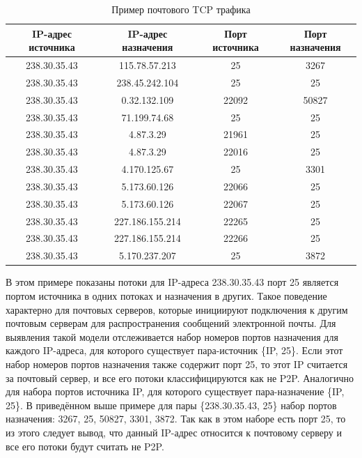 \documentclass[bachelor, och, coursework]{SCWorks}
\begin{document}
\begin{table}[H]
    \caption{Пример почтового TCP трафика}
    \label{table:mail}
    \begin{center}
    {\small
    \begin{tabular}{|c|c|c|c|}
        \hline
    IP-адрес источника & IP-адрес назначения & Порт источника & Порт назначения \\ \hline
    238.30.35.43       &   115.78.57.213     & 25             & 3267 \\ \hline
    238.30.35.43       &    238.45.242.104   & 25             & 25 \\ \hline
    238.30.35.43       &    0.32.132.109     & 22092          & 50827 \\ \hline
    238.30.35.43       &    71.199.74.68     & 25             & 25 \\ \hline
    238.30.35.43       &    4.87.3.29        & 21961          & 25 \\ \hline
    238.30.35.43       &     4.87.3.29       & 22016          & 25 \\ \hline
    238.30.35.43       &     4.170.125.67    & 25             & 3301\\ \hline
    238.30.35.43       &     5.173.60.126    & 22066          & 25 \\ \hline
    238.30.35.43       &     5.173.60.126    & 22067          & 25 \\ \hline
    238.30.35.43       &     227.186.155.214 & 22265          & 25 \\ \hline
    238.30.35.43       &    227.186.155.214  & 22266          & 25\\ \hline
    238.30.35.43       &     5.170.237.207   & 25             & 3872 \\ \hline
    \end{tabular}
    }
    \end{center}
\end{table}

В этом примере показаны потоки для IP-адреса 238.30.35.43 порт 25 является портом источника в одних потоках и назначения в других. Такое поведение характерно для почтовых серверов, которые инициируют подключения к другим почтовым серверам для распространения сообщений электронной почты. Для выявления такой модели отслеживается набор номеров портов назначения для каждого IP-адреса, для которого существует пара-источник \{IP, 25\}. Если этот набор номеров портов назначения также содержит порт 25, то этот IP считается за почтовый сервер, и все его потоки классифицируются как не P2P. Аналогично для набора портов источника IP, для которого существует пара-назначение \{IP, 25\}. В приведённом выше примере для пары \{238.30.35.43, 25\} набор портов назначения: 3267, 25, 50827, 3301, 3872. Так как в этом наборе есть порт 25, то из этого следует вывод, что данный IP-адрес относится к почтовому серверу и все его потоки будут считать не P2P.
\end{document}
